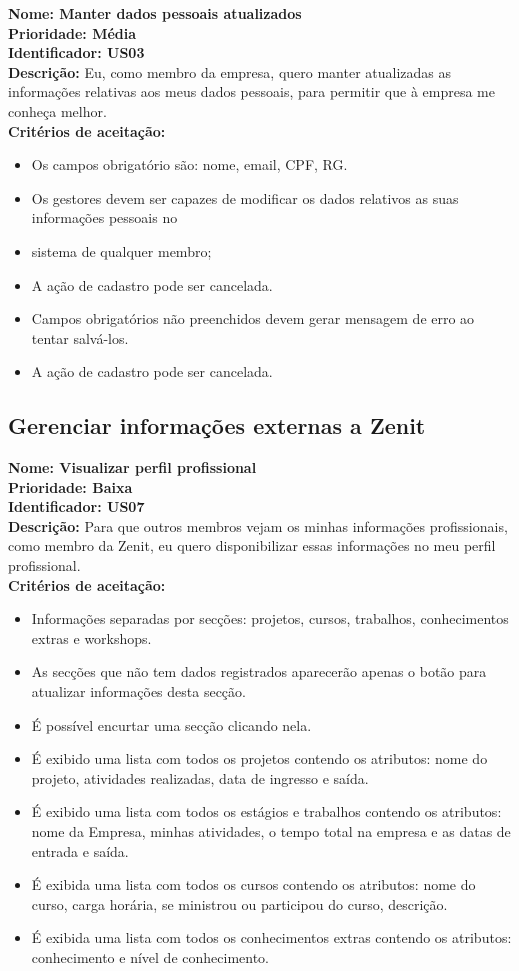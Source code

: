 \begin{anexosenv}
\textbf{Nome: Manter dados pessoais atualizados\\
    Prioridade:  Média\\
    Identificador: US03\\
    Descrição:} Eu, como membro da empresa, quero manter atualizadas as informações relativas aos meus dados pessoais, para permitir que à empresa me conheça melhor.\\
\textbf{Critérios de aceitação:}
\begin{itemize}
    \item Os campos obrigatório são: nome, email, CPF, RG.
    \item Os gestores devem ser capazes de modificar os dados relativos as suas informações pessoais no \item sistema de qualquer membro;
    \item A ação de cadastro pode ser cancelada.
    \item Campos obrigatórios não preenchidos devem gerar mensagem de erro ao tentar salvá-los.
    \item A ação de cadastro pode ser cancelada.
\end{itemize}

\subsection{Gerenciar informações externas a Zenit}

\textbf{Nome: Visualizar perfil profissional\\
    Prioridade: Baixa\\
    Identificador: US07\\
    Descrição: } Para que outros membros vejam os minhas informações profissionais, como membro da Zenit, eu quero disponibilizar essas informações no meu perfil profissional.\\
\textbf{Critérios de aceitação:}
\begin{itemize}
    \item Informações separadas por secções: projetos, cursos, trabalhos, conhecimentos extras e workshops.
    \item   As secções que não tem dados registrados aparecerão apenas o botão para atualizar informações desta secção.
    \item É possível encurtar uma secção clicando nela.
    \item É exibido uma lista com todos os projetos contendo os atributos: nome do projeto, atividades realizadas, data de ingresso e saída.
    \item É exibido uma lista com todos os estágios e trabalhos contendo os atributos: nome da Empresa, minhas atividades, o tempo total na empresa e as datas de entrada e saída.
    \item É exibida uma lista com todos os cursos contendo os atributos: nome do curso, carga horária, se ministrou ou participou do curso, descrição.
    \item É exibida uma lista com todos os conhecimentos extras contendo os atributos: conhecimento e nível de conhecimento.
\end{itemize}


\end{anexosenv}
